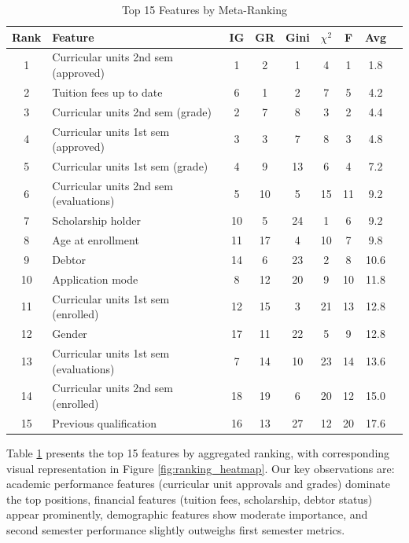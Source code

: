 \documentclass[journal]{IEEEtran}
\begin{document}
\begin{table}[t]
\centering
\caption{Top 15 Features by Meta-Ranking}
\label{tab:feature_ranking}
\begin{tabular}{clccccccc}
\toprule
\textbf{Rank} & \textbf{Feature} & \textbf{IG} & \textbf{GR} & \textbf{Gini} & \textbf{$\chi^2$} & \textbf{F} & \textbf{Avg} \\
\midrule
1 & Curricular units 2nd sem (approved) & 1 & 2 & 1 & 4 & 1 & 1.8 \\
2 & Tuition fees up to date & 6 & 1 & 2 & 7 & 5 & 4.2 \\
3 & Curricular units 2nd sem (grade) & 2 & 7 & 8 & 3 & 2 & 4.4 \\
4 & Curricular units 1st sem (approved) & 3 & 3 & 7 & 8 & 3 & 4.8 \\
5 & Curricular units 1st sem (grade) & 4 & 9 & 13 & 6 & 4 & 7.2 \\
6 & Curricular units 2nd sem (evaluations) & 5 & 10 & 5 & 15 & 11 & 9.2 \\
7 & Scholarship holder & 10 & 5 & 24 & 1 & 6 & 9.2 \\
8 & Age at enrollment & 11 & 17 & 4 & 10 & 7 & 9.8 \\
9 & Debtor & 14 & 6 & 23 & 2 & 8 & 10.6 \\
10 & Application mode & 8 & 12 & 20 & 9 & 10 & 11.8 \\
11 & Curricular units 1st sem (enrolled) & 12 & 15 & 3 & 21 & 13 & 12.8 \\
12 & Gender & 17 & 11 & 22 & 5 & 9 & 12.8 \\
13 & Curricular units 1st sem (evaluations) & 7 & 14 & 10 & 23 & 14 & 13.6 \\
14 & Curricular units 2nd sem (enrolled) & 18 & 19 & 6 & 20 & 12 & 15.0 \\
15 & Previous qualification & 16 & 13 & 27 & 12 & 20 & 17.6 \\
\bottomrule
\end{tabular}
\end{table}

Table \ref{tab:feature_ranking} presents the top 15 features by aggregated ranking, with corresponding visual representation in Figure \ref{fig:ranking_heatmap}. Our key observations are: academic performance features (curricular unit approvals and grades) dominate the top positions, financial features (tuition fees, scholarship, debtor status) appear prominently, demographic features show moderate importance, and second semester performance slightly outweighs first semester metrics.
\end{document}
